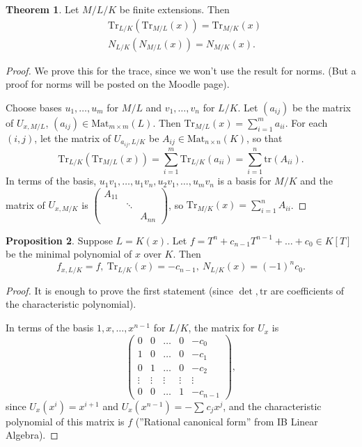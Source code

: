 \documentclass{article}
\theoremstyle{definition}
\newtheorem{theorem}{Theorem}[section]
\newtheorem{prop}[theorem]{Proposition}
\begin{document}
\begin{theorem}\label{13.2}
    Let $M/L/K$ be finite extensions. Then 
    \begin{align*}
        &\text{Tr}_{L/K}(\text{Tr}_{M/L}(x)) = \text{Tr}_{M/K}(x) \\
        &N_{L/K}(N_{M/L}(x)) = N_{M/K}(x).
    \end{align*}
\end{theorem}
\begin{proof}
    We prove this for the trace, since we won't use the result for norms. (But a proof for norms will be posted on the Moodle page).
    \vspace{1mm}
    
    Choose bases $u_1,\ldots,u_m$ for $M/L$ and $v_1,\ldots, v_n$ for $L/K$. Let $(a_{ij})$ be the matrix of $U_{x,M/L}$, $(a_{ij}) \in \text{Mat}_{m \times m}(L)$. Then $\text{Tr}_{M/L}(x)=\sum_{i=1}^{m} a_{ii}$. For each $(i,j)$, let the matrix of $U_{a_{ij},L/K}$ be $A_{ij} \in \text{Mat}_{n \times n}(K)$, so that $$\text{Tr}_{L/K}(\text{Tr}_{M/L}(x)) = \sum_{i=1}^{m} \text{Tr}_{L/K}(a_{ii}) = \sum_{i=1}^{n} \text{tr}(A_{ii}).$$
    In terms of the basis, $u_1v_1,\ldots,u_1v_n,u_2v_1,\ldots,u_mv_n$ is a basis for $M/K$ and the matrix of $U_{x,M/K}$ is $\begin{pmatrix} A_{11} & &\\ & \ddots & \\ & & A_{nn} \end{pmatrix}$, so $\text{Tr}_{M/K}(x)=\sum_{i=1}^{n} A_{ii}$.
\end{proof}
\begin{prop}\label{13.3}
    Suppose $L=K(x)$. Let ${f = T^n + c_{n-1}T^{n-1} + \ldots + c_0 \in K[T]}$ be the minimal polynomial of $x$ over $K$. Then \[
    f_{x,L/K}=f,~ \text{Tr}_{L/K}(x)=-c_{n-1},~ N_{L/K}(x)=(-1)^nc_0.
    \]
\end{prop}
\begin{proof}
    It is enough to prove the first statement (since $\det, \text{tr}$ are coefficients of the characteristic polynomial).

    In terms of the basis $1,x,\ldots,x^{n-1}$ for $L/K$, the matrix for $U_x$ is \[
    \begin{pmatrix}
    0 & 0 & \ldots & 0 &-c_0\\
    1 & 0 & \ldots & 0 &-c_1\\
    0 & 1 & \ldots & 0 & -c_2 \\
    \vdots & \vdots & \vdots & \vdots & \vdots \\
    0 & 0 & \ldots & 1 & -c_{n-1} 
    \end{pmatrix},
    \]
    since $U_x(x^i) = x^{i+1}$ and $U_x(x^{n-1})=- \sum_{}^{} c_jx^j$, and the characteristic polynomial of this matrix is $f$ (''Rational canonical form'' from IB Linear Algebra).
\end{proof}
\end{document}
